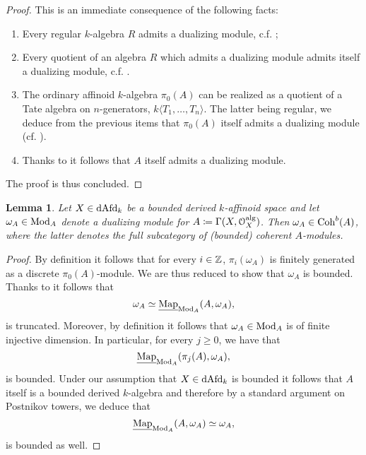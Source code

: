 \documentclass[10pt,a4paper,reqno]{amsart} %
\theoremstyle{plain}
\newtheorem{lem}[thm]{Lemma}
\theoremstyle{definition}
\theoremstyle{remark}
\numberwithin{equation}{section}
\begin{document}
\begin{proof}
    This is an immediate consequence of the following facts:
    \begin{enumerate}
        \item Every regular $k$-algebra $R$ admits a dualizing module, c.f. \cite[\href{https://stacks.math.columbia.edu/tag/0AWX}{Tag 0AWX}]{stacks-project};
        \item Every quotient of an algebra $R$ which admits a dualizing module admits itself a dualizing module, c.f. \cite[\href{https://stacks.math.columbia.edu/tag/0A7I}{Tag 0A7I}]{stacks-project}.
        \item The ordinary affinoid $k$-algebra $\pi_0(A)$ can be realized as a quotient of a Tate algebra on $n$-generators, $k \langle T_1, \dots, T_n \rangle$.
        The latter being regular, we deduce from the previous items that $\pi_0(A)$ itself admits a dualizing module (cf. \cite[\href{https://stacks.math.columbia.edu/tag/0AWX}{Tag 0AWX}]{stacks-project}).
        \item Thanks to \cite[Theorem 4.3.5]{DAG-XIV} it follows that $A$ itself admits a dualizing module.
    \end{enumerate}
    The proof is thus concluded.
\end{proof}

\begin{lem}
    Let $X \in \mathrm{dAfd}_k$ be a bounded derived $k$-affinoid space and let $\omega_A \in \mathrm{Mod}_A$ denote a dualizing module
    for $A \coloneqq \Gamma(X, \mathcal O_X^\mathrm{alg})$. Then $\omega_A \in \mathrm{Coh}^b(A)$, where the latter denotes the
    full subcategory of (bounded) \emph{coherent} $A$-modules.
\end{lem}

\begin{proof}
    By definition it follows that for every $i \in \mathbb Z$, $\pi_i(\omega_A)$ is finitely generated as a discrete $\pi_0(A)$-module.
    We are thus reduced to show that $\omega_A$ is bounded. Thanks to \cite[Theorem 4.2.7]{DAG-XIV} it follows that
        \[
            \omega_A \simeq \underline{\operatorname{Map}}_{\mathrm{Mod}_A}(A, \omega_A),  
        \]
    is truncated. Moreover, by definition it follows that $\omega_A \in \mathrm{Mod}_A$ is of finite injective dimension. In particular, for every
    $j \ge 0$, we have that 
        \[
            \underline{\operatorname{Map}}_{\mathrm{Mod}_A}(\pi_j(A), \omega_A),
        \]
    is bounded. Under our assumption that $X \in \mathrm{dAfd}_k$ is bounded it follows that $A$ itself is a bounded derived $k$-algebra and
    therefore by a standard argument on Postnikov towers, we deduce that
        \[
            \underline{\operatorname{Map}}_{\mathrm{Mod}_A}(A, \omega_A) \simeq \omega_A,
        \]
    is bounded as well.
\end{proof}
\end{document}
